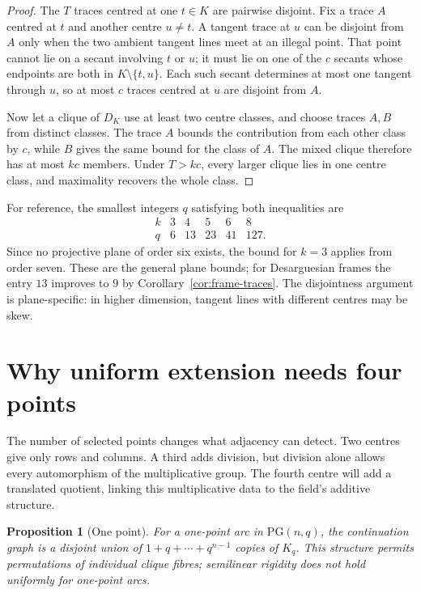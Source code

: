 \documentclass[11pt]{article}
\newtheorem{proposition}[theorem]{Proposition}
\theoremstyle{definition}
\theoremstyle{remark}
\newcommand{\PG}{\mathrm{PG}}
\begin{document}
\begin{proof}
The $T$ traces centred at one $t\in K$ are pairwise disjoint.  Fix a trace
$A$ centred at $t$ and another centre $u\ne t$.  A tangent trace at $u$ can
be disjoint from $A$ only when the two ambient tangent lines meet at an
illegal point.  That point cannot lie on a secant involving $t$ or $u$;
it must lie on one of the $c$ secants whose endpoints are both in
$K\setminus\{t,u\}$.  Each such secant determines at most one tangent
through $u$, so at most $c$ traces centred at $u$ are disjoint from $A$.

Now let a clique of $D_K$ use at least two centre classes, and choose traces
$A,B$ from distinct classes.  The trace $A$ bounds the contribution from
each other class by $c$, while $B$ gives the same bound for the class of
$A$.  The mixed clique therefore has at most $kc$ members.  Under $T>kc$,
every larger clique lies in one centre class, and maximality recovers the
whole class.
\end{proof}

For reference, the smallest integers $q$ satisfying both inequalities are
\[
\begin{array}{c|ccccc}
k&3&4&5&6&8\\ \hline
q&6&13&23&41&127.
\end{array}
\]
Since no projective plane of order six exists, the bound for $k=3$
applies from order seven.
These are the general plane bounds; for Desarguesian frames the entry
$13$ improves to $9$ by Corollary~\ref{cor:frame-traces}.  The disjointness
argument is plane-specific: in higher dimension, tangent lines with
different centres may be skew.

\section{Why uniform extension needs four points}
\label{sec:obstructions}

The number of selected points changes what adjacency can detect. Two
centres give only rows and columns. A third adds division, but division
alone allows every automorphism of the multiplicative group. The fourth
centre will add a translated quotient, linking this multiplicative data
to the field's additive structure.


\begin{proposition}[One point]\label{prop:one-point}
For a one-point arc in $\PG(n,q)$, the continuation graph is a disjoint
union of $1+q+\cdots+q^{n-1}$ copies of $K_q$.  This structure permits permutations of individual clique fibres;
semilinear rigidity does not hold uniformly for one-point arcs.
\end{proposition}
\end{document}
